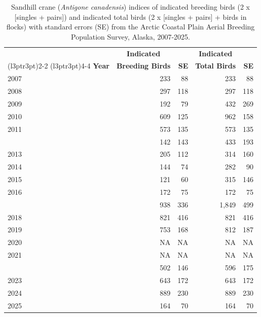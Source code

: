 \documentclass[
]{article}
\begin{document}
\begin{longtable}[t]{lrrrr}

\caption{\label{tbl-SACR}Sandhill crane (\emph{Antigone canadensis})
indices of indicated breeding birds (2 x {[}singles + pairs{]}) and
indicated total birds (2 x {[}singles + pairs{]} + birds in flocks) with
standard errors (SE) from the Arctic Coastal Plain Aerial Breeding
Population Survey, Alaska, 2007-2025.}

\tabularnewline

\\
\toprule
\multicolumn{1}{c}{\textbf{ }} & \multicolumn{1}{c}{\textbf{Indicated}} & \multicolumn{1}{c}{\textbf{ }} & \multicolumn{1}{c}{\textbf{Indicated}} & \multicolumn{1}{c}{\textbf{ }} \\
\cmidrule(l{3pt}r{3pt}){2-2} \cmidrule(l{3pt}r{3pt}){4-4}
\textbf{Year} & \textbf{Breeding Birds} & \textbf{SE} & \textbf{Total Birds} & \textbf{SE}\\
\midrule
2007 & 233 & 88 & 233 & 88\\
2008 & 297 & 118 & 297 & 118\\
2009 & 192 & 79 & 432 & 269\\
2010 & 609 & 125 & 962 & 158\\
2011 & 573 & 135 & 573 & 135\\
\addlinespace
2012 & 142 & 143 & 433 & 193\\
2013 & 205 & 112 & 314 & 160\\
2014 & 144 & 74 & 282 & 90\\
2015 & 121 & 60 & 315 & 146\\
2016 & 172 & 75 & 172 & 75\\
\addlinespace
2017 & 938 & 336 & 1,849 & 499\\
2018 & 821 & 416 & 821 & 416\\
2019 & 753 & 168 & 812 & 187\\
2020 & NA & NA & NA & NA\\
2021 & NA & NA & NA & NA\\
\addlinespace
2022 & 502 & 146 & 596 & 175\\
2023 & 643 & 172 & 643 & 172\\
2024 & 889 & 230 & 889 & 230\\
2025 & 164 & 70 & 164 & 70\\
\bottomrule

\end{longtable}

\endgroup{}

\newpage{}
\end{document}
